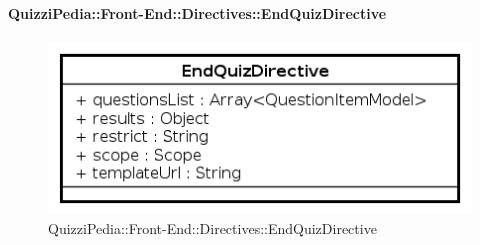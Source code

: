 	\paragraph{QuizziPedia::Front-End::Directives::EndQuizDirective}
		
		\label{QuizziPedia::Front-End::Directives::EndQuizDirective}
		
		\begin{figure}[ht]
			\centering
			\includegraphics[scale=0.80,keepaspectratio]{UML/Classi/Front-End/QuizziPedia_Front-end_Directives_EndQuizDirective.png}
			\caption{QuizziPedia::Front-End::Directives::EndQuizDirective}
		\end{figure} \FloatBarrier
		
